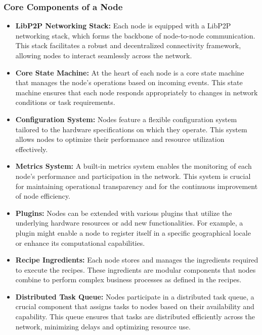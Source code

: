 \documentclass[11pt]{article}
\begin{document}
\subsubsection*{Core Components of a Node}
\begin{itemize}
    \item \textbf{LibP2P Networking Stack:} Each node is equipped with a LibP2P networking stack, which forms the backbone of node-to-node communication. This stack facilitates a robust and decentralized connectivity framework, allowing nodes to interact seamlessly across the network.
    
    \item \textbf{Core State Machine:} At the heart of each node is a core state machine that manages the node's operations based on incoming events. This state machine ensures that each node responds appropriately to changes in network conditions or task requirements.
    
    \item \textbf{Configuration System:} Nodes feature a flexible configuration system tailored to the hardware specifications on which they operate. This system allows nodes to optimize their performance and resource utilization effectively.
    
    \item \textbf{Metrics System:} A built-in metrics system enables the monitoring of each node’s performance and participation in the network. This system is crucial for maintaining operational transparency and for the continuous improvement of node efficiency.
    
    \item \textbf{Plugins:} Nodes can be extended with various plugins that utilize the underlying hardware resources or add new functionalities. For example, a plugin might enable a node to register itself in a specific geographical locale or enhance its computational capabilities.
    
    \item \textbf{Recipe Ingredients:} Each node stores and manages the ingredients required to execute the recipes. These ingredients are modular components that nodes combine to perform complex business processes as defined in the recipes.
    
    \item \textbf{Distributed Task Queue:} Nodes participate in a distributed task queue, a crucial component that assigns tasks to nodes based on their availability and capability. This queue ensures that tasks are distributed efficiently across the network, minimizing delays and optimizing resource use.
\end{itemize}
\end{document}
